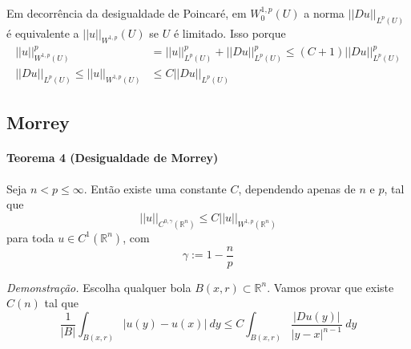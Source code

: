 \documentclass[11pt]{article}
\newcommand{\Rn}{{\mathbb{R}^n}}
\newcommand{\nor}[2]{||#1||_{#2}}
\begin{document}
Em decorrência da desigualdade de Poincaré, em $ W^{1,p}_0(U) $ a norma $ ||Du||_{L^p(U)} $ é equivalente a $ ||u||_{W^{1,p}}(U) $ se $U$ é limitado. Isso porque \begin{align*}
	 ||u||_{W^{1,p}(U)}^p &= \nor{u}{L^p(U)}^p + \nor{Du}{L^p(U)}^p \leq (C + 1) \nor{Du}{L^p(U)}^p \\
	 \nor{Du}{L^p(U)} \leq ||u||_{W^{1,p}(U)} &\leq C \nor{Du}{L^p(U)}
\end{align*}


\subsection{Morrey}

\paragraph{Teorema 4 (Desigualdade de Morrey)}\label{t:sobolev-ineq-t4} Seja \( n < p \leq \infty \). Então existe uma constante \( C\), dependendo apenas de \(n\) e \(p\), tal que \[ ||u||_{C^{0, \gamma}(\Rn)} \leq C ||u||_{W^{1,p}(\Rn)} \] para toda \( u \in C^1 (\Rn)\), com \[ \gamma := 1 - \frac{n}{p} \]

\textit{Demonstração.} Escolha qualquer bola $B(x,r) \subset \Rn$. Vamos provar que existe $ C(n) $ tal que \[ \frac{1}{|B|} \int_{B(x,r)} |u(y) - u(x)| \ dy \leq C \int_{B(x,r)}  \frac{|Du(y)|}{|y-x|^{n-1}}\ dy   \]
\end{document}
